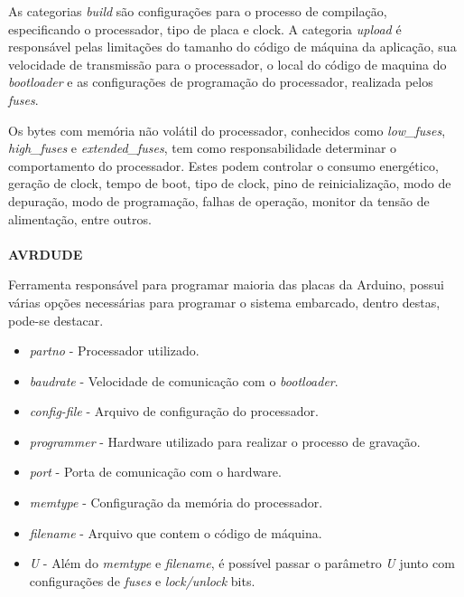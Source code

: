 As categorias \textit{build} são configurações para o processo de compilação, especificando o processador, tipo de placa e clock. A categoria \textit{upload} é responsável pelas limitações do tamanho do código de máquina da aplicação, sua velocidade de transmissão para o processador, o local do código de maquina do \textit{bootloader} e as configurações de programação do processador, realizada pelos \textit{fuses}. 

Os bytes com memória não volátil do processador, conhecidos como \textit{low\_fuses}, \textit{high\_fuses} e \textit{extended\_fuses}, tem como responsabilidade determinar o comportamento do processador. Estes podem controlar o consumo energético, geração de clock, tempo de boot, tipo de clock, pino de reinicialização, modo de depuração, modo de programação, falhas de operação, monitor da tensão de alimentação, entre outros\cite{fuseSettings}\cite{fuses}.
\\
\\
\textbf{AVRDUDE}

Ferramenta responsável para programar maioria das placas da Arduino, possui várias opções necessárias para programar o sistema embarcado, dentro destas, pode-se destacar.

\begin{itemize}
\item \textit{partno} - Processador utilizado.

\item \textit{baudrate} - Velocidade de comunicação com o \textit{bootloader}.

\item \textit{config-file} - Arquivo de configuração do processador.

\item \textit{programmer} - Hardware utilizado para realizar o processo de gravação.

\item \textit{port} - Porta de comunicação com o hardware.

\item \textit{memtype} - Configuração da memória do processador.

\item \textit{filename} - Arquivo que contem o código de máquina.

\item \textit{U} - Além do \textit{memtype} e \textit{filename}, é possível passar o parâmetro \textit{U} junto com configurações de \textit{fuses} e \textit{lock/unlock} bits.
\end{itemize}

